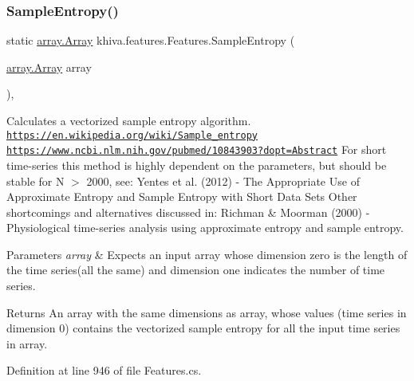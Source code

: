 \subsubsection{\texorpdfstring{Sample\+Entropy()}{SampleEntropy()}}
{\footnotesize\ttfamily static \mbox{\hyperlink{classkhiva_1_1array_1_1_array}{array.\+Array}} khiva.\+features.\+Features.\+Sample\+Entropy (\begin{DoxyParamCaption}\item[{\mbox{\hyperlink{classkhiva_1_1array_1_1_array}{array.\+Array}}}]{array }\end{DoxyParamCaption})\hspace{0.3cm}{\ttfamily [inline]}, {\ttfamily [static]}}



Calculates a vectorized sample entropy algorithm. \href{https://en.wikipedia.org/wiki/Sample_entropy}{\tt https\+://en.\+wikipedia.\+org/wiki/\+Sample\+\_\+entropy} \href{https://www.ncbi.nlm.nih.gov/pubmed/10843903?dopt=Abstract}{\tt https\+://www.\+ncbi.\+nlm.\+nih.\+gov/pubmed/10843903?dopt=\+Abstract} For short time-\/series this method is highly dependent on the parameters, but should be stable for N $>$ 2000, see\+: Yentes et al. (2012) -\/ The Appropriate Use of Approximate Entropy and Sample Entropy with Short Data Sets Other shortcomings and alternatives discussed in\+: Richman \& Moorman (2000) -\/ Physiological time-\/series analysis using approximate entropy and sample entropy. 


\begin{DoxyParams}{Parameters}
{\em array} & Expects an input array whose dimension zero is the length of the time series(all the same) and dimension one indicates the number of time series.\\
\hline
\end{DoxyParams}
\begin{DoxyReturn}{Returns}
An array with the same dimensions as array, whose values (time series in dimension 0) contains the vectorized sample entropy for all the input time series in array.
\end{DoxyReturn}


Definition at line 946 of file Features.\+cs.

\mbox{\label{classkhiva_1_1features_1_1_features_a31ad18b51c0f5016e87fbd4e6e61be4f}} 
